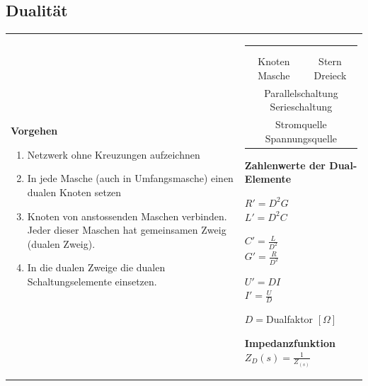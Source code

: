 \subsection{Dualität}
	\begin{tabular}{ll}
    \parbox{11.5cm}{    		
			\textbf{Vorgehen}
			\begin{enumerate}{\setlength{\itemsep}{0cm}\setlength{\parsep}{0cm} \setlength{\topsep}{0cm}}
	          \item Netzwerk ohne Kreuzungen aufzeichnen
	          \item In jede Masche (auch in Umfangsmasche) einen dualen Knoten
	          setzen
	          \item Knoten von anstossenden Maschen verbinden. Jeder dieser Maschen
	          hat gemeinsamen Zweig (dualen Zweig). 
	          \item  In die dualen Zweige die dualen Schaltungselemente einsetzen.
	        \end{enumerate}
    	}
    	& \parbox{6.5cm}{
    		\begin{tabular}{c c}
            $C \leftrightarrow L$ 
            	&$R \leftrightarrow G$ \\
            $u \leftrightarrow i$
            	& $\underline{Z} \leftrightarrow \underline{Y}$ \\
            Knoten $\leftrightarrow$ Masche
            	& Stern $\leftrightarrow$ Dreieck \\
            \multicolumn{2}{c}{Parallelschaltung $\leftrightarrow$
            	Serieschaltung} \\
            \multicolumn{2}{c}{Stromquelle $\leftrightarrow$ Spannungsquelle}            
	        \end{tabular}
			\vspace{.1cm} 

			\textbf{Zahlenwerte der Dual-Elemente}\\
			\begin{minipage}{2cm}
	        	$R'=D^2G$ \\
	        	$L'=D^2C$
	        \end{minipage}
			\begin{minipage}{2cm}
	        	$C'=\frac{L}{D^2}$ \\
	        	$G'=\frac{R}{D^2}$
	        \end{minipage}
			\begin{minipage}{2cm}
	        	$U'=DI$ \\
	        	$I'=\frac{U}{D}$
	        \end{minipage}
			\begin{minipage}{4cm}
	        	$D =$Dualfaktor $[\Omega]$
	        \end{minipage}
			\vspace{.1cm} 

    		\textbf{Impedanzfunktion}
    		$Z_D(s) = \frac{1}{Z_(s)}$ \\
    	}
    \end{tabular}

